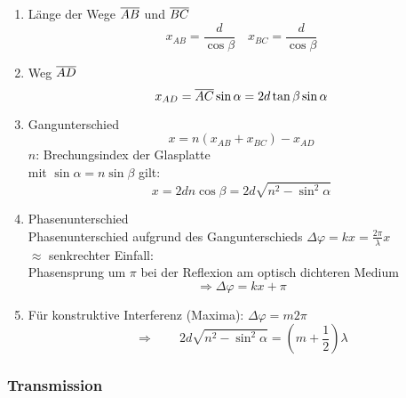 \begin{enumerate}[(1)]
	\item Länge der Wege $ \overline{AB} $ und $ \overline{BC} $
	\begin{equation*}
	x_{AB} = \frac{d}{\cos \beta} \quad x_{BC} = \frac{d}{\cos \beta}
	\end{equation*}
	\item Weg $ \overline{AD} $
	\begin{equation*}
	x_{AD} = \overline{AC} \sin \alpha = 2 d \tan \beta \sin \alpha
	\end{equation*}
	\item Gangunterschied
	\begin{equation*}
	x = n \left(x_{AB} + x _{BC}\right) - x_{AD}
	\end{equation*}
	$ n $: Brechungsindex der Glasplatte\\
	mit $ \sin \alpha = n \sin \beta $ gilt:
	\begin{equation*}
	x = 2 d n \cos \beta = 2 d \sqrt{n^2 - \sin^2 \alpha}
	\end{equation*}
	\item Phasenunterschied\\
	Phasenunterschied aufgrund des Gangunterschieds $ \Delta \varphi = kx = \frac{2\pi}{\lambda} x $\\
	$ \approx $ senkrechter Einfall:\\
	Phasensprung um $ \pi $ bei der Reflexion am optisch dichteren Medium \color{red!75!black} \mau \color{black}\\
	\begin{equation*}
	\Rightarrow \Delta \varphi = k x  + \pi
	\end{equation*}
	\item Für konstruktive Interferenz (Maxima): $ \Delta \varphi = m 2 \pi $
	\begin{equation*}
	\Rightarrow \qquad 2 d \sqrt{n^2 - \sin^2 \alpha} = \left(m + \frac{1}{2}\right) \lambda
	\end{equation*}
\end{enumerate}

\subsubsection{Transmission}

